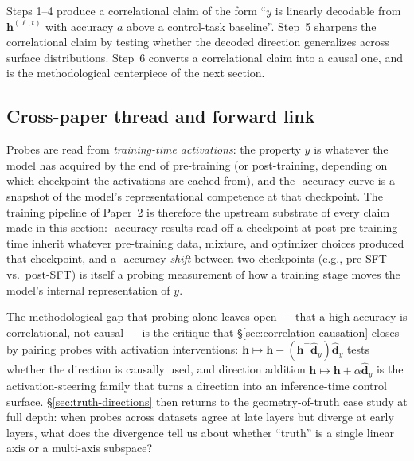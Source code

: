 Steps 1--4 produce a correlational claim of the form ``$y$ is linearly
decodable from $\mathbf{h}^{(\ell, t)}$ with accuracy $a$ above a
control-task baseline''. Step~5 sharpens the correlational claim by
testing whether the decoded direction generalizes across surface
distributions. Step~6 converts a correlational claim into a causal one,
and is the methodological centerpiece of the next section.

\subsection{Cross-paper thread and forward link}
\label{sec:probe-forward}

Probes are read from \emph{training-time activations}: the property
$y$ is whatever the model has acquired by the end of pre-training (or
post-training, depending on which checkpoint the activations are cached
from), and the -accuracy curve is a snapshot of the model's
representational competence at that checkpoint. The training pipeline
of Paper~2 is therefore the upstream substrate of every claim made in
this section: -accuracy results read off a checkpoint at
post-pre-training time inherit whatever pre-training data, mixture, and
optimizer choices produced that checkpoint, and a -accuracy
\emph{shift} between two checkpoints (e.g., pre-SFT vs.\ post-SFT) is
itself a probing measurement of how a training stage moves the model's
internal representation of $y$.

The methodological gap that probing alone leaves open — that a
high-accuracy  is correlational, not causal — is the
critique that
\S\ref{sec:correlation-causation} closes by pairing probes with
activation interventions: 
$\mathbf{h} \mapsto \mathbf{h} - (\mathbf{h}^\top \hat{\mathbf{d}}_y)\hat{\mathbf{d}}_y$
tests whether the direction is causally used, and direction addition
$\mathbf{h} \mapsto \mathbf{h} + \alpha \hat{\mathbf{d}}_y$ is the
activation-steering family that turns a  direction into an
inference-time control surface. \S\ref{sec:truth-directions} then
returns to the geometry-of-truth case study at full depth: when probes
across datasets agree at late layers but diverge at early layers, what
does the divergence tell us about whether ``truth'' is a single linear
axis or a multi-axis subspace?
